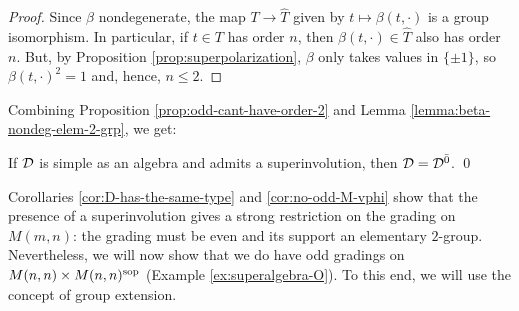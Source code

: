 \begin{proof}
    Since $\beta$ nondegenerate, the map $T \to \widehat T$ given by $t \mapsto \beta(t, \cdot)$ is a group isomorphism.
    In particular, if $t\in T$ has order $n$, then $\beta(t, \cdot)\in \widehat T$ also has order $n$.
    But, by Proposition \ref{prop:superpolarization}, $\beta$ only takes values in $\{ \pm 1\}$, so  $\beta(t, \cdot )^2 =1$ and, hence, $ n \leq 2$.
\end{proof}

Combining Proposition \ref{prop:odd-cant-have-order-2} and Lemma \ref{lemma:beta-nondeg-elem-2-grp}, we get:

\begin{cor}%
    If $\mathcal{D}$ is simple as an algebra and admits a superinvolution, then $\mathcal{D} = \mathcal{D}^{\bar0}$. \qed
\end{cor}


Corollaries \ref{cor:D-has-the-same-type} and \ref{cor:no-odd-M-vphi} show that the presence of a superinvolution gives a strong restriction on the grading on $M(m,n)$: the grading must be even and its support an elementary $2$-group. 
Nevertheless, we will now show that we do have odd gradings on $M(n,n)\times M(n,n)^{\mathrm{sop}}$ (Example \ref{ex:superalgebra-O}). 
To this end, we will use the concept of group extension.

